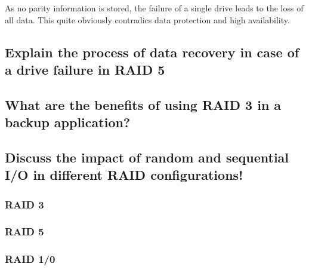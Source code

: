 \documentclass{article}
\begin{document}
	As no parity information is stored,
	the failure of a single drive leads to the loss of all data.
	This quite obviously contradics data protection and high availability.

\subsection{Explain the process of data recovery in case of a drive failure in RAID 5}

\subsection{What are the benefits of using RAID 3 in a backup application?}

\subsection{Discuss the impact of random and sequential I/O in different RAID configurations!}
\subsubsection*{RAID 3}

\subsubsection*{RAID 5}

\subsubsection*{RAID 1/0}
\end{document}
